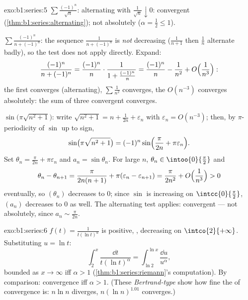 \begin{solution}{exo:b1:series:5}
$\sum \frac{(-1)^n}{\sqrt n}$: alternating with $\frac{1}{\sqrt n}
\downarrow 0$: convergent (\cref{thm:b1:series:alternating}); not
absolutely ($\alpha = \frac12 \leq 1$).

$\sum \frac{(-1)^n}{n + (-1)^n}$: the sequence $\frac{1}{n +
(-1)^n}$ is \emph{not} decreasing ($\frac{1}{n+1}$ then
$\frac{1}{n}$ alternate badly), so the test does not apply directly.
Expand:
\[
\frac{(-1)^n}{n + (-1)^n}
= \frac{(-1)^n}{n}\cdot\frac{1}{1 + \frac{(-1)^n}{n}}
= \frac{(-1)^n}{n} - \frac{1}{n^2} +
O\Bigl(\frac{1}{n^3}\Bigr):
\]
the first  converges (alternating), $\sum \frac{1}{n^2}$
converges, the $O(n^{-3})$ converges absolutely: the sum of three
convergent  converges.

$\sin\bigl(\pi\sqrt{n^2+1}\bigr)$: write $\sqrt{n^2 + 1} = n +
\frac{1}{2n} + \varepsilon_n$ with $\varepsilon_n = O(n^{-3})$;
then, by $\pi$-periodicity of $\sin$ up to sign,
\[
\sin\bigl(\pi\sqrt{n^2+1}\bigr)
= (-1)^n \sin\Bigl(\frac{\pi}{2n} + \pi\varepsilon_n\Bigr) .
\]
Set $\theta_n = \frac{\pi}{2n} + \pi\varepsilon_n$ and $a_n =
\sin\theta_n$. For large $n$, $\theta_n \in \intoo{0}{\frac\pi2}$
and
\[
\theta_n - \theta_{n+1} = \frac{\pi}{2n(n+1)} +
\pi(\varepsilon_n - \varepsilon_{n+1})
= \frac{\pi}{2n^2} + O\Bigl(\frac{1}{n^3}\Bigr) > 0
\]
eventually, so $(\theta_n)$ decreases to $0$; since $\sin$ is
increasing on $\intcc{0}{\frac\pi2}$, $(a_n)$ decreases to $0$ as
well. The alternating test applies: convergent --- not absolutely,
since $a_n \sim \frac{\pi}{2n}$.
\end{solution}

\begin{solution}{exo:b1:series:6}
$f(t) = \frac{1}{t(\ln t)^\alpha}$ is positive, ,
decreasing on $\intco{2}{+\infty}$. Substituting $u = \ln t$:
\[
\int_2^x \frac{\dd t}{t(\ln t)^\alpha}
= \int_{\ln 2}^{\ln x} \frac{\dd u}{u^\alpha},
\]
bounded as $x \to \infty$ iff $\alpha > 1$
(\cref{thm:b1:series:riemann}'s computation). By 
comparison: convergence iff $\alpha > 1$. (These \emph{Bertrand-type}
 show how fine the  of convergence is: $n\ln n$
diverges, $n(\ln n)^{1.01}$ converges.)
\end{solution}

